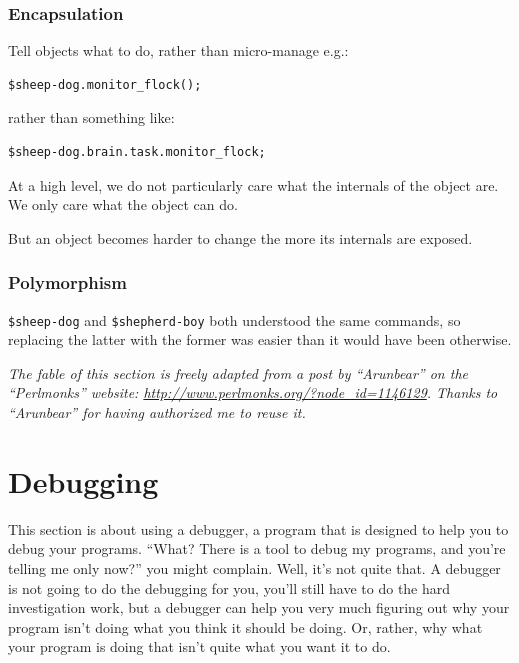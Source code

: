\subsubsection{Encapsulation}

Tell objects what to do, rather than micro-manage e.g.:

\begin{verbatim}
$sheep-dog.monitor_flock();
\end{verbatim}

rather than something like:

\begin{verbatim}
$sheep-dog.brain.task.monitor_flock;
\end{verbatim}

At a high level, we do not particularly care 
what the internals of the object are. We only 
care what the object can do.

But an object becomes harder to change the 
more its internals are exposed.

\subsubsection{Polymorphism}
\verb'$sheep-dog' and \verb'$shepherd-boy' both 
understood the same commands, so replacing the 
latter with the former was easier than it would 
have been otherwise. 

\emph{The fable of this section is freely adapted 
from a post by ``Arunbear'' on the ``Perlmonks'' 
website: \url{http://www.perlmonks.org/?node_id=1146129}. 
Thanks to ``Arunbear'' for having authorized me 
to reuse it.}


\section{Debugging}
\label{perl-debugger}

This section is about using a debugger, a program that is 
designed to help you to debug your programs. ``What? There 
is a tool to debug my programs, and you're telling me only 
now?'' you might complain. Well, it's not quite that. A debugger 
is not going to do the debugging for you, you'll still have 
to do the hard investigation work, but a debugger can help 
you very much figuring out why your program isn't doing 
what you think it should be doing. Or, rather, why what your 
program is doing that isn't quite what you want it to do.

